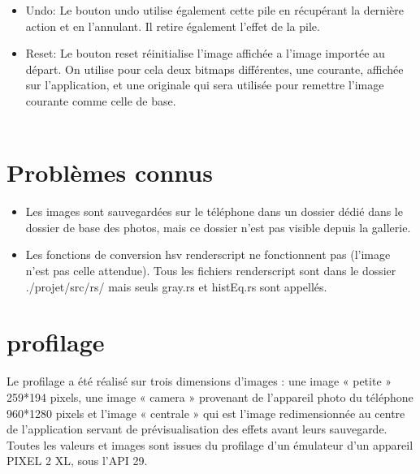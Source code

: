 \documentclass[12pt]{article}
\begin{document}
\begin{itemize}
\begin{itemize}
\item Undo:
Le bouton undo utilise également cette pile en récupérant la dernière action et en l'annulant. Il retire également l'effet de la pile.
\\

\item Reset:
    Le bouton reset réinitialise l’image affichée a l’image importée au départ.
    On utilise pour cela deux bitmaps différentes, une courante, affichée sur l’application, et une originale qui sera utilisée pour remettre l’image courante comme celle de base.\\
    \\

\end{itemize}

\section{Problèmes connus}

\begin{itemize}
    \item Les images sont sauvegardées sur le téléphone dans un dossier dédié dans le dossier de base des photos, mais ce dossier n'est pas visible depuis la gallerie.\\
    \item Les fonctions de conversion hsv renderscript ne fonctionnent pas (l'image n'est pas celle attendue). Tous les fichiers renderscript sont dans le dossier ./projet/src/rs/ mais seuls gray.rs et histEq.rs sont appellés.\\
\end{itemize}




\section{profilage}
 \bigskip
    Le profilage  a été réalisé sur trois dimensions d’images : une image « petite » 259*194 pixels,  une image « camera » provenant de l’appareil photo du téléphone 960*1280 pixels et l’image « centrale » qui est l’image redimensionnée au centre de l’application servant de prévisualisation des effets avant leurs sauvegarde.\\
    Toutes les valeurs et images sont issues du profilage d’un émulateur d’un appareil PIXEL 2 XL, sous l’API 29.\\


\end{itemize}
\end{document}

